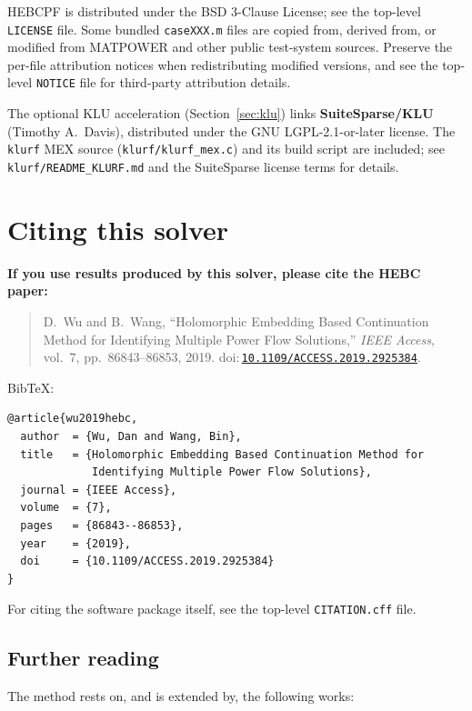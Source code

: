 \documentclass[11pt,a4paper]{article}
\newcommand{\doi}[1]{\href{https://doi.org/#1}{\nolinkurl{#1}}}
\newcommand{\code}[1]{\texttt{#1}}
\begin{document}
HEBCPF is distributed under the BSD 3-Clause License; see the top-level
\code{LICENSE} file. Some bundled \code{caseXXX.m} files are copied from, derived from,
or modified from MATPOWER and other public test-system sources. Preserve the per-file
attribution notices when redistributing modified versions, and see the top-level
\code{NOTICE} file for third-party attribution details.

The optional KLU acceleration (Section~\ref{sec:klu}) links \textbf{SuiteSparse/KLU}
(Timothy A.~Davis), distributed under the GNU LGPL-2.1-or-later license. The \code{klurf}
MEX source (\code{klurf/klurf_mex.c}) and its build script are included; see
\code{klurf/README_KLURF.md} and the SuiteSparse license terms for details.

\section{Citing this solver}\label{sec:cite}

\textbf{If you use results produced by this solver, please cite the HEBC paper:}
\begin{quote}
D.\ Wu and B.\ Wang, ``Holomorphic Embedding Based Continuation Method for Identifying
Multiple Power Flow Solutions,'' \emph{IEEE Access}, vol.~7, pp.~86843--86853, 2019.
doi:\,\doi{10.1109/ACCESS.2019.2925384}.
\end{quote}

BibTeX:
\begin{lstlisting}[style=sh]
@article{wu2019hebc,
  author  = {Wu, Dan and Wang, Bin},
  title   = {Holomorphic Embedding Based Continuation Method for
             Identifying Multiple Power Flow Solutions},
  journal = {IEEE Access},
  volume  = {7},
  pages   = {86843--86853},
  year    = {2019},
  doi     = {10.1109/ACCESS.2019.2925384}
}
\end{lstlisting}

For citing the software package itself, see the top-level \code{CITATION.cff} file.

\subsection*{Further reading}
The method rests on, and is extended by, the following works:
\end{document}
